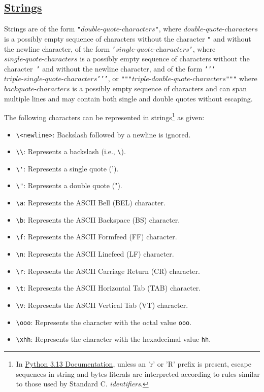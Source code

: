 \subsection*{\href{https://sourceacademy.org/sicpjs/2.3.1}{Strings}}

Strings are of the form \texttt{"}$ \textit{double-quote-characters} $\texttt{"},
where $\textit{double-quote-characters}$ is a possibly empty sequence of characters without
the character \texttt{"} and without the newline character, 
of the form
\texttt{'}$ \textit{single-quote-characters} $\texttt{'},
where $\textit{single-quote-characters}$ is a possibly empty sequence of characters without
the character~\texttt{'} and without the newline character,
and of the form
\texttt{'}\texttt{'}\texttt{'}$ \textit{triple-single-quote-characters} $\texttt{'}\texttt{'}\texttt{'}, or 
\texttt{"""}$ \textit{triple-double-quote-characters} $\texttt{"""}
where $\textit{backquote-characters}$ is a possibly empty sequence of characters and 
can span multiple lines and may contain both single and double quotes without escaping.

The following characters can be represented in strings\footnote{
In \href{https://docs.python.org/3/reference/lexical_analysis.html}{
\color{DarkBlue} Python 3.13 Documentation},
unless an 'r' or 'R' prefix is present, escape sequences in string and bytes literals are interpreted according to rules similar to those used by Standard C. \emph{identifiers}.
} as given:
\begin{itemize}
    \item \verb|\<newline>|: Backslash followed by a newline is ignored.
    \item \verb|\\|: Represents a backslash (i.e., \texttt{\textbackslash}).
    \item \verb|\'|: Represents a single quote (').
    \item \verb|\"|: Represents a double quote (").
    \item \verb|\a|: Represents the ASCII Bell (BEL) character.
    \item \verb|\b|: Represents the ASCII Backspace (BS) character.
    \item \verb|\f|: Represents the ASCII Formfeed (FF) character.
    \item \verb|\n|: Represents the ASCII Linefeed (LF) character.
    \item \verb|\r|: Represents the ASCII Carriage Return (CR) character.
    \item \verb|\t|: Represents the ASCII Horizontal Tab (TAB) character.
    \item \verb|\v|: Represents the ASCII Vertical Tab (VT) character.
    \item \verb|\ooo|: Represents the character with the octal value \texttt{ooo}.
    \item \verb|\xhh|: Represents the character with the hexadecimal value \texttt{hh}.
\end{itemize}

